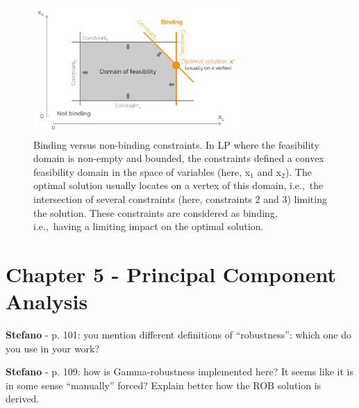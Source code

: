 \documentclass[12pt,a4paper]{article}
\def\ie{i.e.,\ }
\begin{document}
\begin{figure}[!htbp]
\centering
\includegraphics[width=0.7\textwidth]{Binding_constr.pdf}
\caption{Binding versus non-binding constraints. In LP where the feasibility domain is non-empty and bounded, the constraints defined a convex feasibility domain in the space of variables (here, x$_1$ and x$_2$). The optimal solution usually locates on a vertex of this domain, \ie the intersection of several constraints (here, constraints 2 and 3) limiting the solution. These constraints are considered as binding, \ie having a limiting impact on the optimal solution.}
\label{fig:Binding_constr}
\end{figure}

\section{Chapter 5 - Principal Component Analysis}
\label{PCA}

\begin{mdframed}[style=comment] %
{\color{orange} \textbf{Stefano}} - p. 101: you mention different definitions of “robustness”: which one do you use in your work?
\end{mdframed}

\noindent 

\begin{mdframed}[style=manuscript] %

\end{mdframed}

\begin{mdframed}[style=comment] %
{\color{orange} \textbf{Stefano}} - p. 109: how is Gamma-robustness implemented here? It seems like it is in some sense “manually” forced? Explain better how the ROB solution is derived.
\end{mdframed}

\noindent 
\end{document}
